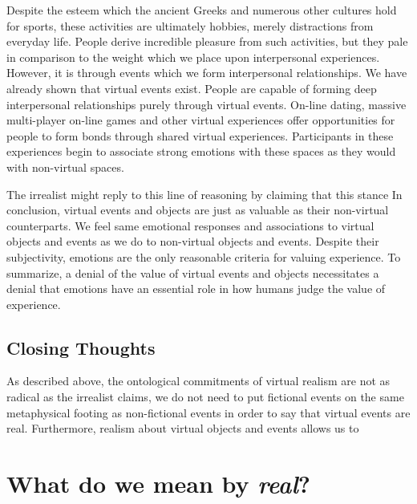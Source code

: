 Despite the esteem which the ancient Greeks and numerous other cultures hold for sports, these activities are ultimately hobbies, merely distractions from everyday life. People derive incredible pleasure from such activities, but they pale in comparison to the weight which we place upon interpersonal experiences. However, it is through events which we form interpersonal relationships. We have already shown that virtual events exist. People are capable of forming deep interpersonal relationships purely through virtual events. On-line dating, massive multi-player on-line games and other virtual experiences offer opportunities for people to form bonds through shared virtual experiences. Participants in these experiences begin to associate strong emotions with these spaces as they would with non-virtual spaces. \cite{Cacioppo_2013}

The irrealist might reply to this line of reasoning by claiming that this stance 
 In conclusion, virtual events and objects are just as valuable as their non-virtual counterparts. We feel same emotional responses and associations to virtual objects and events as we do to non-virtual objects and events. Despite their subjectivity, emotions are the only reasonable criteria for valuing experience. To summarize, a denial of the value of virtual events and objects necessitates a denial that emotions have an essential role in how humans judge the value of experience.   

\section{Closing Thoughts}
As described above, the ontological commitments of virtual realism are not as radical as the irrealist claims, we do not need to put fictional events on the same metaphysical footing as non-fictional events in order to say that virtual events are real. Furthermore, realism about virtual objects and events allows us to 

\chapter{What do we mean by \textit{real}?}
